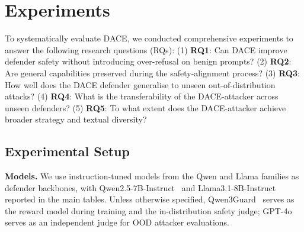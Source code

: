 \documentclass{article}
\newcommand{\method}{\textsc{DACE}\xspace}
\begin{document}
\section{Experiments}
\label{sec:experiments}

To systematically evaluate \method, we conducted comprehensive experiments to answer the following research questions (RQs):
(1) \textbf{RQ1}: Can \method improve defender safety without introducing over-refusal on benign prompts?
(2) \textbf{RQ2}: Are general capabilities preserved during the safety-alignment process?
(3) \textbf{RQ3}: How well does the \method defender generalise to unseen out-of-distribution attacks?
(4) \textbf{RQ4}: What is the transferability of the \method-attacker across unseen defenders?
(5) \textbf{RQ5}: To what extent does the \method-attacker achieve broader strategy and textual diversity?


\subsection{Experimental Setup}
\label{sec:exp-setup}

\textbf{Models.}\quad
We use instruction-tuned models from the Qwen and Llama families as defender backbones, with Qwen2.5-7B-Instruct~\citep{yang2025qwen25} and Llama3.1-8B-Instruct~\citep{touvron2023llama} reported in the main tables. Unless otherwise specified, Qwen3Guard~\citep{zhao2025qwen3guard} serves as the reward model during training and the in-distribution safety judge; GPT-4o~\citep{openai2024gpt} serves as an independent judge for OOD attacker evaluations.
\end{document}
